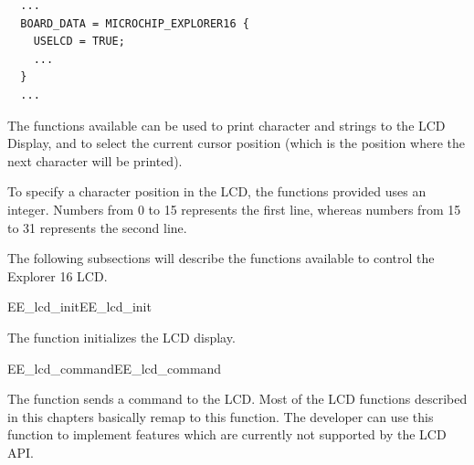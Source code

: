 \begin{lstlisting}
  ...
  BOARD_DATA = MICROCHIP_EXPLORER16 {
    USELCD = TRUE;
    ...
  }
  ...
\end{lstlisting}

The functions available can be used to print character and strings to
the LCD Display, and to select the current cursor position (which is
the position where the next character will be printed).

To specify a character position in the LCD, the functions provided
uses an integer. Numbers from 0 to 15 represents the first line,
whereas numbers from 15 to 31 represents the second line.

The following subsections will describe the functions available to
control the Explorer 16 LCD.


\begin{function_nopb2}{EE\_lcd\_init}{EE_lcd_init}
  
  \begin{fundescription}
    The function initializes the LCD display.
  \end{fundescription}
  
  
  
\end{function_nopb2}

\begin{function_nopb2}{EE\_lcd\_command}{EE_lcd_command}
  
  \begin{fundescription}
    The function sends a command to the LCD. Most of the LCD functions
    described in this chapters basically remap to this function. The
    developer can use this function to implement features which are
    currently not supported by the LCD API.
  \end{fundescription}
  
  \begin{funparameters}
  \end{funparameters}
  
  
\end{function_nopb2}

